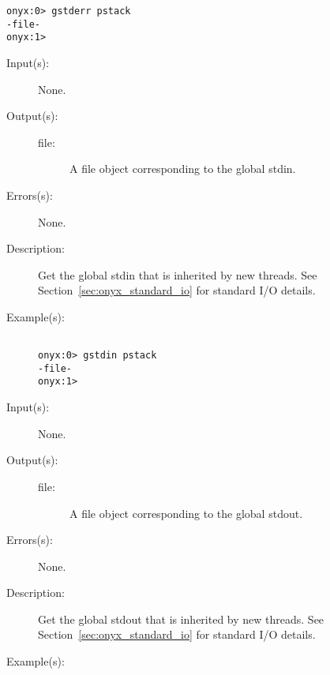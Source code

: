 \begin{description}
\begin{description}
\begin{verbatim}
onyx:0> gstderr pstack
-file-
onyx:1>
		\end{verbatim}
	\end{description}
\label{systemdict:gstdin}
\item[{\onyxop{--}{gstdin}{file}}: ]
	\begin{description}\item[]
	\item[Input(s): ] None.
	\item[Output(s): ]
		\begin{description}\item[]
		\item[file: ]
			A file object corresponding to the global stdin.
		\end{description}
	\item[Errors(s): ] None.
	\item[Description: ]
		Get the global stdin that is inherited by new threads.  See
		Section~\ref{sec:onyx_standard_io} for standard I/O details.
	\item[Example(s): ]\begin{verbatim}

onyx:0> gstdin pstack
-file-
onyx:1>
		\end{verbatim}
	\end{description}
\label{systemdict:gstdout}
\item[{\onyxop{--}{gstdout}{file}}: ]
	\begin{description}\item[]
	\item[Input(s): ] None.
	\item[Output(s): ]
		\begin{description}\item[]
		\item[file: ]
			A file object corresponding to the global stdout.
		\end{description}
	\item[Errors(s): ] None.
	\item[Description: ]
		Get the global stdout that is inherited by new threads.  See
		Section~\ref{sec:onyx_standard_io} for standard I/O details.
	\item[Example(s): ]\begin{verbatim}


\end{verbatim}
\end{description}
\end{description}
